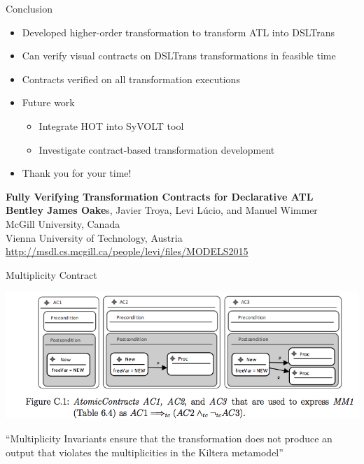 \documentclass[xcolor=dvipsnames, 12pt]{beamer}
\begin{document}
\begin{frame}{Conclusion}
\begin{itemize}[<+->]
\item Developed higher-order transformation to transform ATL into DSLTrans
\item Can verify visual contracts on DSLTrans transformations in feasible time
\item Contracts verified on all transformation executions
\item Future work
\begin{itemize}
\item Integrate HOT into SyVOLT tool
\item Investigate contract-based transformation development
\end{itemize}
\end{itemize}
\pause
\begin{itemize}
\item Thank you for your time!
\end{itemize}
\begin{center}
\textbf{Fully Verifying Transformation Contracts for Declarative ATL}\\
\textbf{Bentley James Oake}s, Javier Troya, Levi L\'{u}cio, and Manuel Wimmer\\
McGill University, Canada\\Vienna University of Technology, Austria\\
\url{http://msdl.cs.mcgill.ca/people/levi/files/MODELS2015}

\end{center}
\end{frame}

\begin{frame}{Multiplicity Contract}
\begin{center}
\includegraphics[width=\textwidth]{figures/multi}
\end{center}
``Multiplicity Invariants ensure that the transformation does not produce an output that violates the multiplicities in the Kiltera metamodel''
\end{frame}
\end{document}
